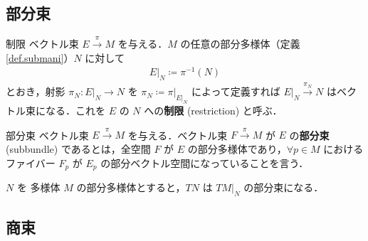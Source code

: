 \documentclass[geometry_main]{subfiles}
\begin{document}
\subsection{部分束}

\begin{mydef}[label=def.restriction]{制限}
	ベクトル束 $E \xrightarrow{\pi} M$ を与える．$M$ の任意の部分多様体（定義\ref{def.submani}）$N$ に対して
	\begin{align}
		E|_N \coloneqq \pi^{-1}(N)
	\end{align}
	とおき，射影 $\pi_N \colon E|_N \to N$ を $\pi_N \coloneqq \pi|_{E|_N}$ によって定義すれば $E|_N \xrightarrow{\pi_N} N$ はベクトル束になる．これを $E$ の $N$ への\textbf{制限} (restriction) と呼ぶ． 
\end{mydef}

\begin{mydef}[label=def.subbundle]{部分束}
	ベクトル束 $E \xrightarrow{\pi} M$ を与える．ベクトル束 $F \xrightarrow{\pi} M$ が $E$ の\textbf{部分束} (subbundle) であるとは，全空間 $F$ が $E$ の部分多様体であり，$\forall p \in M$ におけるファイバー $F_p$ が $E_p$ の部分ベクトル空間になっていることを言う．
\end{mydef}

$N$ を \cinfty 多様体 $M$ の部分多様体とすると，$TN$ は $TM|_N$ の部分束になる．

\subsection{商束}


\end{document}
